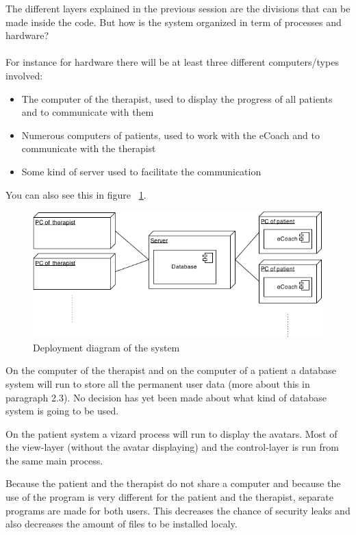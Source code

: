 
The different layers explained in the previous session are the divisions that can be made inside the code. But how is the system organized in term of processes and hardware? 
\paragraph{}
For instance for hardware there will be at least three different computers/types involved: 
\begin{itemize}
\item The computer of the therapist, used to display the progress of all patients and to communicate with them
\item Numerous computers of patients, used to work with the eCoach and to communicate with the therapist
\item Some kind of server used to facilitate the communication
\end{itemize}
You can also see this in figure ~\ref{fig:deploymentdiagram}.
\begin{figure}
  \centering
  \includegraphics[width=\textwidth]{deployment-diagram.png}
  \caption{Deployment diagram of the system} 
  \label{fig:deploymentdiagram}
\end{figure}
On the computer of the therapist and on the computer of a patient a database system will run to store all the permanent user data (more about this in paragraph 2.3).  No decision has yet been made about what kind of database system is going to be used.

On the patient system a vizard process will run to display the avatars. Most of the view-layer (without the avatar displaying) and the control-layer is run from the same main process. 

Because the patient and the therapist do not share a computer and because the use of the program is very different for the patient and the therapist, separate programs are made for both users. This decreases the chance of security leaks and also decreases the amount of files to be installed localy.

